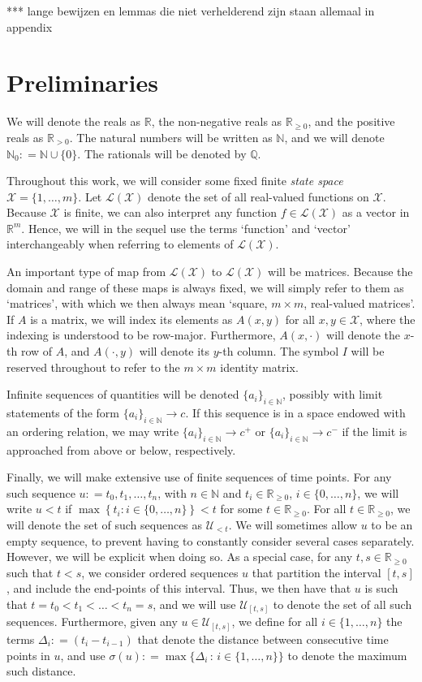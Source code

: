\documentclass[10pt]{paper}
\theoremstyle{definition}
\newcommand{\nats}{\mathbb{N}}
\newcommand{\reals}{\mathbb{R}}
\newcommand{\realspos}{\reals_{>0}}
\newcommand{\realsnonneg}{\reals_{\geq 0}}
\newcommand{\states}{\mathcal{X}}
\newcommand{\gambles}{\mathcal{L}}
\newcommand{\gamblesX}{\gambles(\states)}
\newcommand{\coloneqq}{:\!=}
\begin{document}
*** lange bewijzen en lemmas die niet verhelderend zijn staan allemaal in appendix

\section{Preliminaries}\label{sec:prelim}

We will denote the reals as $\reals$, the non-negative reals as $\realsnonneg$, and the positive reals as $\realspos$. The natural numbers will be written as $\nats$, and we will denote $\nats_0\coloneqq\nats\cup\{0\}$. The rationals will be denoted by $\mathbb{Q}$.

Throughout this work, we will consider some fixed finite \emph{state space} $\states=\{1,\dots,m\}$. Let $\gamblesX$ denote the set of all real-valued functions on $\states$. Because $\states$ is finite, we can also interpret any function $f\in\gamblesX$ as a vector in $\reals^m$. Hence, we will in the sequel use the terms `function' and `vector' interchangeably when referring to elements of $\gamblesX$.

An important type of map from $\gamblesX$ to $\gamblesX$ will be matrices. Because the domain and range of these maps is always fixed, we will simply refer to them as `matrices', with which we then always mean `square, $m\times m$, real-valued matrices'. If $A$ is a matrix, we will index its elements as $A(x,y)$ for all $x,y\in\states$, where the indexing is understood to be row-major. Furthermore, $A(x,\cdot)$ will denote the $x$-th row of $A$, and $A(\cdot,y)$ will denote its $y$-th column. The symbol $I$ will be reserved throughout to refer to the $m\times m$ identity matrix.

Infinite sequences of quantities will be denoted $\{a_i\}_{i\in\nats}$, possibly with limit statements of the form $\{a_i\}_{i\in\nats}\to c$. If this sequence is in a space endowed with an ordering relation, we may write $\{a_i\}_{i\in\nats}\to c^+$ or $\{a_i\}_{i\in\nats}\to c^-$ if the limit is approached from above or below, respectively.

Finally, we will make extensive use of finite sequences of time points. For any such sequence $u\coloneqq t_0,t_1,\ldots,t_n$, with $n\in\nats$ and $t_i\in\realsnonneg$, $i\in\{0,\ldots,n\}$, we will write $u<t$ if $\max\left\{t_i:i\in\{0,\ldots,n\}\right\}<t$ for some $t\in\realsnonneg$. For all $t\in\realsnonneg$, we will denote the set of such sequences as $\mathcal{U}_{<t}$. We will sometimes allow $u$ to be an empty sequence, to prevent having to constantly consider several cases separately. However, we will be explicit when doing so. As a special case, for any $t,s\in\realsnonneg$ such that $t<s$, we consider ordered sequences $u$ that partition the interval $[t,s]$, and include the end-points of this interval. Thus, we then have that $u$ is such that $t=t_0 < t_1 <\ldots < t_n = s$, and we will use $\mathcal{U}_{[t,s]}$ to denote the set of all such sequences. Furthermore, given any $u\in\mathcal{U}_{[t,s]}$, we define for all $i\in\{1,\ldots,n\}$ the terms $\Delta_i\coloneqq (t_i-t_{i-1})$ that denote the distance between consecutive time points in $u$, and use $\sigma(u) \coloneqq \max\bigl\{\Delta_i\,:\,i\in\{1,\ldots,n\}\bigr\}$ to denote the maximum such distance.
\end{document}
